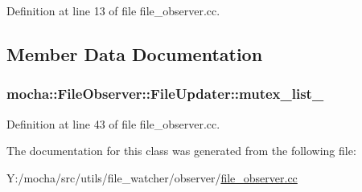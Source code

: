 Definition at line 13 of file file\_\-observer.cc.



\subsection{Member Data Documentation}
\hypertarget{classmocha_1_1_file_observer_1_1_file_updater_a12e24a3b76615c93d5fc14a3eea7354d}{
\subsubsection[{mutex\_\-list\_\-}]{ {\bf mocha::FileObserver::FileUpdater::mutex\_\-list\_\-}}}
\label{classmocha_1_1_file_observer_1_1_file_updater_a12e24a3b76615c93d5fc14a3eea7354d}


Definition at line 43 of file file\_\-observer.cc.



The documentation for this class was generated from the following file:\begin{DoxyCompactItemize}
\item 
Y:/mocha/src/utils/file\_\-watcher/observer/\hyperlink{file__observer_8cc}{file\_\-observer.cc}\end{DoxyCompactItemize}
